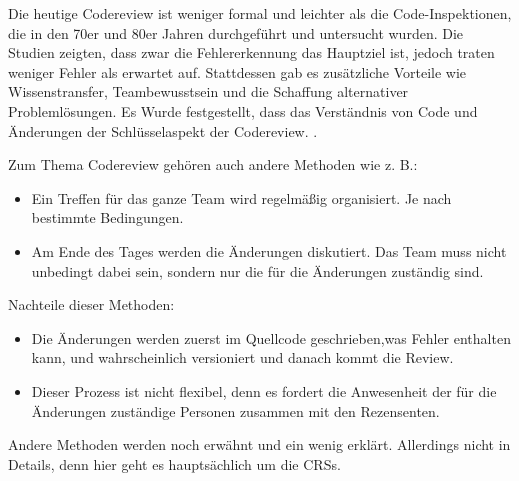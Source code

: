 
Die heutige Codereview ist weniger formal und leichter als die Code-Inspektionen, die in den 70er und 80er Jahren durchgeführt und untersucht wurden. Die Studien zeigten, dass zwar die Fehlererkennung das Hauptziel ist, jedoch traten weniger Fehler als erwartet auf. Stattdessen gab es zusätzliche Vorteile wie Wissenstransfer, Teambewusstsein und die Schaffung alternativer Problemlösungen. Es Wurde festgestellt, dass das Verständnis von Code und Änderungen der Schlüsselaspekt der Codereview. \cite[Seite 1]{bacchelli2013expectations}.

Zum Thema Codereview gehören auch andere Methoden wie \ac{z. B.}:

\begin{itemize}
	\item Ein Treffen für das ganze Team wird regelmäßig organisiert. Je nach bestimmte Bedingungen.
	\item Am Ende des Tages werden die Änderungen diskutiert. Das Team muss nicht unbedingt dabei sein, sondern nur die für die Änderungen zuständig sind.
\end{itemize} 

Nachteile dieser Methoden:
\begin{itemize}
	\item Die Änderungen werden zuerst im Quellcode geschrieben,was Fehler enthalten kann, und wahrscheinlich versioniert und danach kommt die Review.
	\item Dieser Prozess ist nicht flexibel, denn es fordert die Anwesenheit der für die Änderungen zuständige Personen zusammen mit den Rezensenten.
\end{itemize}

Andere Methoden werden noch erwähnt und ein wenig erklärt. Allerdings nicht in Details, denn hier geht es hauptsächlich um die \acp{CRS}.
